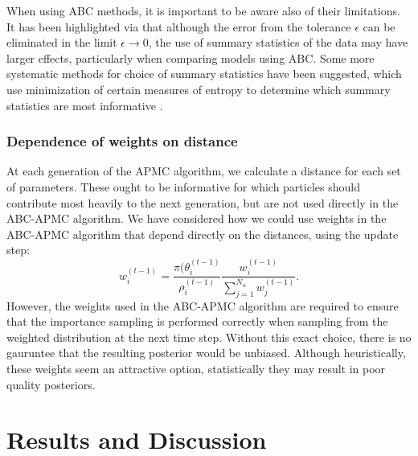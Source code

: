 \documentclass[twocolumn]{biophys}
\begin{document}
When using ABC methods, it is important to be aware also of their limitations. 
It has been highlighted via \citet{robert2011lack} that although the error from the tolerance $\epsilon$ can be eliminated in the limit $\epsilon \rightarrow 0$, the use of summary statistics of the data may have larger effects, particularly when comparing models using ABC.
Some more systematic methods for choice of summary statistics have been suggested, which use minimization of certain measures of entropy to determine which summary statistics are most informative \citep{nunes2010optimal}.

\subsubsection{Dependence of weights on distance}
At each generation of the APMC algorithm, we calculate a distance for each set of parameters.
These ought to be informative for which particles should contribute most heavily to the next generation, but are not used directly in the ABC-APMC algorithm.
We have considered how we could use weights in the ABC-APMC algorithm that depend directly on the distances, using the update step: 
\begin{equation}
 w_{i}^{(t-1)} = \frac{\pi(\theta_i^{(t-1)}}{\rho_i^{(t-1)}} \frac{ w_i^{(t-1)} }{\sum_{j=1}^{N_{\alpha}} w_j^{(t-1)} }. 
\end{equation}                                                                                                                                                       
However, the weights used in the ABC-APMC algorithm are required to ensure that the importance sampling is performed correctly when sampling from the weighted distribution at the next time step.
Without this exact choice, there is no gauruntee that the resulting posterior would be unbiased.
Although heuristically, these weights seem an attractive option, statistically they may result in poor quality posteriors.

\section{Results and Discussion}
\end{document}

